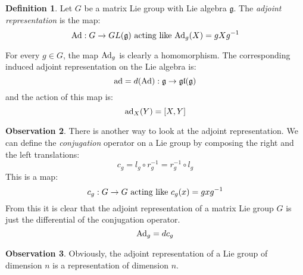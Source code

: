 \documentclass[12pt,a4paper]{report}
\theoremstyle{definition}
\newtheorem{Def}{Definition}[chapter]
\theoremstyle{Theorem}
\theoremstyle{definition}
\theoremstyle{definition}
\newtheorem{Obs}[Def]{Observation}
\begin{document}
	\begin{Def}
		Let $G$ be a matrix Lie group with Lie algebra $\mathfrak{g}$. The \textit{adjoint representation} is the map:
		$$\hbox{Ad}:G\rightarrow GL(\mathfrak{g})\hbox{ acting like } \hbox{Ad}_g(X)=gXg^{-1}$$
	\end{Def}
	For every $g\in G$, the map $\hbox{Ad}_g$ is clearly a homomorphism. The corresponding induced adjoint representation on the Lie algebra is:
	$$\hbox{ad}=d(\hbox{Ad}):\mathfrak{g}\rightarrow\mathfrak{gl(g)}$$
	and the action of this map is:
	$$\hbox{ad}_X(Y)=[X,Y]$$
	\begin{Obs}
		There is another way to look at the adjoint representation. We can define the \textit{conjugation} operator on a Lie group by composing the right and the left translations:
		$$c_g=l_g\circ r_g^{-1}=r_g^{-1}\circ l_g$$
		This is a map:
		$$c_g:G\rightarrow G\hbox{ acting like } c_g(x)=gxg^{-1}$$
		From this it is clear that the adjoint representation of a matrix Lie group $G$ is just the differential of the conjugation operator.
		$$\hbox{Ad}_g=dc_g$$
	\end{Obs}
	\begin{Obs}
		Obviously, the adjoint representation of a Lie group of dimension $n$ is a representation of dimension $n$.
	\end{Obs}
\end{document}
